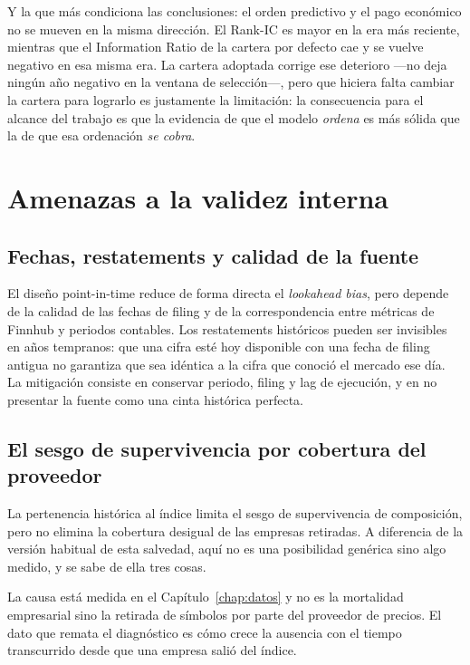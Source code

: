 Y la que más condiciona las conclusiones: el orden predictivo y el pago económico no se mueven en
la misma dirección. El Rank-IC es mayor en la era más reciente, mientras que el
Information Ratio de la cartera por defecto cae y se vuelve negativo en esa misma era. La cartera
adoptada corrige ese deterioro ---no deja ningún año negativo en la ventana de selección---, pero
que hiciera falta cambiar la cartera para lograrlo es justamente la limitación: la consecuencia para
el alcance del trabajo es que la evidencia de que el modelo \emph{ordena} es más sólida que la de
que esa ordenación \emph{se cobra}.

\section{Amenazas a la validez interna}

\subsection{Fechas, restatements y calidad de la fuente}

El diseño point-in-time reduce de forma directa el \textit{lookahead bias}, pero depende de la
calidad de las fechas de filing y de la correspondencia entre métricas de Finnhub y periodos
contables. Los restatements históricos pueden ser invisibles en años tempranos: que una cifra esté
hoy disponible con una fecha de filing antigua no garantiza que sea idéntica a la cifra que conoció
el mercado ese día. La mitigación consiste en conservar periodo, filing y lag de ejecución, y en no
presentar la fuente como una cinta histórica perfecta.

\subsection{El sesgo de supervivencia por cobertura del proveedor}

La pertenencia histórica al índice limita el sesgo de supervivencia de composición, pero no elimina
la cobertura desigual de las empresas retiradas. A diferencia de la versión habitual de esta
salvedad, aquí no es una posibilidad genérica sino algo medido, y se sabe de ella tres cosas.

La causa está medida en el Capítulo~\ref{chap:datos} y no es la mortalidad empresarial sino
la retirada de símbolos por parte del proveedor de precios. El dato que remata el diagnóstico es
cómo crece la ausencia con el tiempo transcurrido desde que una empresa salió del índice.


